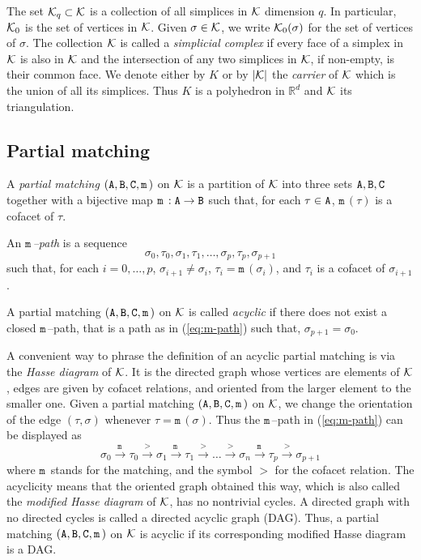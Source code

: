 \documentclass[12pt]{article}
\newcommand{\R}{{\mathbb R}}
\newcommand{\cK}{{\cal K}}
\newcommand{\ma}{\texttt{m}\,} \newcommand{\re}{\texttt{r}\,}
\newcommand{\sB}{\texttt{B}}
\newcommand{\sC}{\texttt{C}} \newcommand{\sD}{\texttt{D}} \newcommand{\sM}{\texttt{M}} \newcommand{\sL}{\texttt{L}}
\begin{document}
The set $\cK_q\subset \cK$ is a collection of all simplices in $\cK$ dimension $q$. In particular, $\cK_0$ is the set of vertices in $\cK$. Given $\sigma\in\cK$, we write $\cK_0(\sigma)$ for the set of vertices of $\sigma$. The collection $\cK$ is called a {\em simplicial complex} if every face of a simplex in $\cK$ is also in $\cK$ and the intersection of any two simplices in $\cK$, if non-empty, is their common face. We denote either by $K$ or by $|\cK|$ the {\em carrier} of  $\cK$ which is the union of all its simplices. Thus $K$ is a polyhedron in $\R^d$ and $\cK$ its triangulation.

\subsection{Partial matching}\label{sec:match}

A {\em partial matching} $(\sA,\sB,\sC,\ma)$ on $\cK$ is a partition of $\cK$ into three
sets $\sA,\sB,\sC$ together with a bijective  map $\ma: \sA\to \sB$  such that, for each $\tau\in \texttt{A}$, $\ma(\tau)$ is a cofacet of $\tau$.

An {\em $\ma$--path} is a sequence
\begin{equation}\label{eq:m-path}
\sigma_0,\tau_0,\sigma_1,\tau_1,\ldots ,\sigma_p,\tau_p,\sigma_{p+1}
\end{equation}
such that, for each $i=0,\ldots ,p$, $\sigma_{i+1}\ne \sigma_i$, $\tau_i=\ma(\sigma_i)$, and $\tau_i$ is a
cofacet of  $\sigma_{i+1}$.

A partial matching $(\sA,\sB,\sC,\ma)$ on $\cK$ is called {\em acyclic} if there does not exist a closed $\ma$--path, that is a path as in (\ref{eq:m-path}) such that, $\sigma_{p+1}=\sigma_0$.

A convenient way to phrase the definition of an acyclic partial matching is via the {\em Hasse diagram} of $\cK$. It is the directed graph whose vertices are elements of $\cK$, edges are given by cofacet relations, and oriented from the larger element to the smaller one. Given a partial matching $(\sA,\sB,\sC,\ma)$ on  $\cK$, we change the orientation of the edge $(\tau, \sigma)$ whenever $\tau = \ma(\sigma)$. Thus the $\ma$--path in (\ref{eq:m-path}) can be displayed as
\begin{equation}\label{eq:Hasse}
\sigma_0 \xrightarrow{\ma}  \tau_0 \xrightarrow{>} \sigma_1 \xrightarrow{\ma} \tau_1 \xrightarrow{>} \ldots \xrightarrow{>} \sigma_n \xrightarrow{\ma}
\tau_p \xrightarrow{>} \sigma_{p+1}
\end{equation}
where $\ma$ stands for the matching, and the symbol $>$ for the cofacet relation. The acyclicity means that the oriented graph obtained this way, which is also called the {\em modified Hasse diagram} of $\cK$, has no nontrivial cycles. A directed graph with no directed cycles is called a directed acyclic graph (DAG). Thus, a partial matching $(\sA,\sB,\sC,\ma)$ on $\cK$ is acyclic if its corresponding modified Hasse diagram is a DAG.
\end{document}

